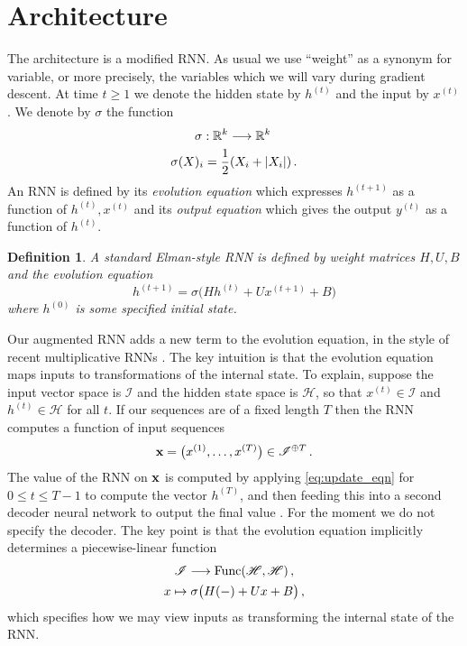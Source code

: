 \documentclass[english,letter paper,12pt,leqno]{article}
\theoremstyle{example}
\newtheorem{definition}[theorem]{Definition}
\numberwithin{equation}{section}
\def\be{\begin{equation}}
\def\ee{\end{equation}}
\begin{document}
\section{Architecture}

The architecture is a modified RNN. As usual we use ``weight'' as a synonym for variable, or more precisely, the variables which we will vary during gradient descent. At time $t \ge 1$ we denote the hidden state by $h^{(t)}$ and the input by $x^{(t)}$. We denote by $\sigma$ the function
\begin{gather*}
\sigma: \mathbb{R}^k \longrightarrow \mathbb{R}^k\,\\
\sigma( X )_i = \frac{1}{2}( X_i + |X_i| )\,.
\end{gather*}
An RNN is defined by its \emph{evolution equation} which expresses $h^{(t+1)}$ as a function of $h^{(t)}, x^{(t)}$ and its \emph{output equation} which gives the output $y^{(t)}$ as a function of $h^{(t)}$.

\begin{definition} A standard Elman-style RNN \cite{elman} is defined by weight matrices $H, U, B$ and the evolution equation
\be\label{eq:update_eqn}
h^{(t+1)} = \sigma\big( H h^{(t)} + U x^{(t+1)} + B\big)
\ee
where $h^{(0)}$ is some specified initial state.
\end{definition}

Our augmented RNN adds a new term to the evolution equation, in the style of recent multiplicative RNNs \cite{yuhai,sutskever,irsoy}. The key intuition is that the evolution equation maps inputs to transformations of the internal state. To explain, suppose the input vector space is $\mathscr{I}$ and the hidden state space is $\mathscr{H}$, so that $x^{(t)} \in \mathscr{I}$ and $h^{(t)} \in \mathscr{H}$ for all $t$. If our sequences are of a fixed length $T$ then the RNN computes a function of input sequences
\[
\bold{x} = \big( x^{(1)}, \ldots, x^{(T)} \big) \in \mathscr{I}^{\oplus T}\,.
\]
The value of the RNN on $\bold{x}$ is computed by applying \eqref{eq:update_eqn} for $0 \le t \le T - 1$ to compute the vector $h^{(T)}$, and then feeding this into a second decoder neural network to output the final value \cite{sutskever2}. For the moment we do not specify the decoder. The key point is that the evolution equation implicitly determines a piecewise-linear function
\begin{gather*}
\mathscr{I} \longrightarrow \operatorname{Func}(\mathscr{H}, \mathscr{H} )\,,\\
x \mapsto \sigma\big( H (-) + U x + B\big)\,,
\end{gather*}
which specifies how we may view inputs as transforming the internal state of the RNN.
\end{document}
